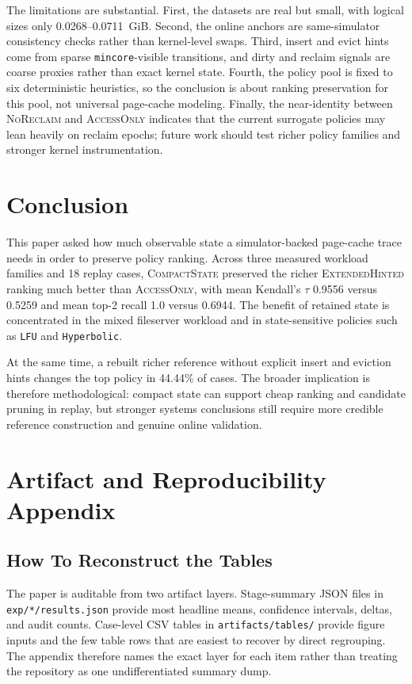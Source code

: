 \documentclass{article}
\newcommand{\traceext}{\textsc{ExtendedHinted}}
\newcommand{\tracecompact}{\textsc{CompactState}}
\newcommand{\traceaccess}{\textsc{AccessOnly}}
\newcommand{\tracenoreclaim}{\textsc{NoReclaim}}
\begin{document}
The limitations are substantial. First, the datasets are real but small, with logical sizes only 0.0268--0.0711~GiB. Second, the online anchors are same-simulator consistency checks rather than kernel-level swaps. Third, insert and evict hints come from sparse \texttt{mincore}-visible transitions, and dirty and reclaim signals are coarse proxies rather than exact kernel state. Fourth, the policy pool is fixed to six deterministic heuristics, so the conclusion is about ranking preservation for this pool, not universal page-cache modeling. Finally, the near-identity between \tracenoreclaim{} and \traceaccess{} indicates that the current surrogate policies may lean heavily on reclaim epochs; future work should test richer policy families and stronger kernel instrumentation.

\section{Conclusion}
\label{sec:conclusion}
This paper asked how much observable state a simulator-backed page-cache trace needs in order to preserve policy ranking. Across three measured workload families and 18 replay cases, \tracecompact{} preserved the richer \traceext{} ranking much better than \traceaccess{}, with mean Kendall's $\tau$ 0.9556 versus 0.5259 and mean top-2 recall 1.0 versus 0.6944. The benefit of retained state is concentrated in the mixed fileserver workload and in state-sensitive policies such as \texttt{LFU} and \texttt{Hyperbolic}.

At the same time, a rebuilt richer reference without explicit insert and eviction hints changes the top policy in 44.44\% of cases. The broader implication is therefore methodological: compact state can support cheap ranking and candidate pruning in replay, but stronger systems conclusions still require more credible reference construction and genuine online validation.

\appendix

\section{Artifact and Reproducibility Appendix}
\label{app:repro}
\subsection{How To Reconstruct the Tables}
The paper is auditable from two artifact layers. Stage-summary JSON files in \texttt{exp/*/results.json} provide most headline means, confidence intervals, deltas, and audit counts. Case-level CSV tables in \texttt{artifacts/tables/} provide figure inputs and the few table rows that are easiest to recover by direct regrouping. The appendix therefore names the exact layer for each item rather than treating the repository as one undifferentiated summary dump.
\end{document}
